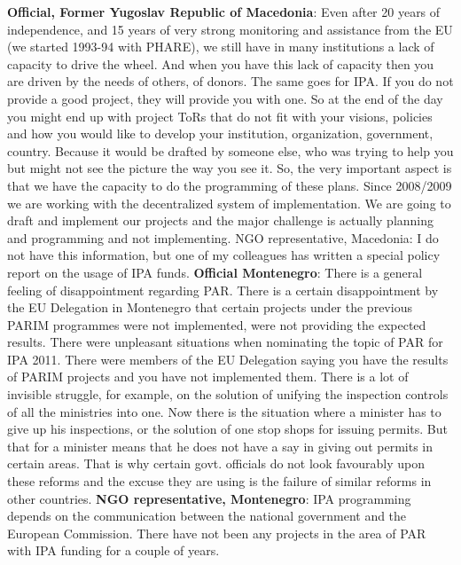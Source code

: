 \textbf{Official, Former Yugoslav Republic of Macedonia}: Even after 20 years of independence, and 15 years of very strong monitoring and assistance from the EU (we started 1993-94 with PHARE), we still have in many institutions a lack of capacity to drive the wheel. And when you have this lack of capacity then you are driven by the needs of others, of donors. The same goes for IPA. If you do not provide a good project, they will provide you with one. So at the end of the day you might end up with project ToRs that do not fit with your visions, policies and how you would like to develop your institution, organization, government, country. Because it would be drafted by someone else, who was trying to help you but might not see the picture the way you see it. So, the very important aspect is that we have the capacity to do the programming of these plans. Since 2008/2009 we are working with the decentralized system of implementation. We are going to draft and implement our projects and the major challenge is actually planning and programming and not implementing.
NGO representative, Macedonia: I do not have this information, but one of my colleagues has written a special policy report on the usage of IPA funds. 
\textbf{Official Montenegro}: There is a general feeling of disappointment regarding  PAR. There is a certain disappointment by the EU Delegation in Montenegro that certain projects under the previous PARIM programmes were not implemented, were not providing the expected results. There were unpleasant situations when nominating the topic of PAR for IPA 2011. There were members of the EU Delegation saying you have the results of PARIM projects and you have not implemented them. There is a lot of invisible struggle, for example, on the solution of unifying the inspection controls of all the ministries into one. Now there is the situation where a minister has to give up his inspections, or the solution of one stop shops for issuing permits. But that for a minister means that he does not have a say in giving out permits in certain areas. That is why certain govt. officials do not look favourably upon these reforms and the excuse they are using is the failure of similar reforms in other countries.
\textbf{NGO representative, Montenegro}: IPA programming depends on the communication between the national government and the European Commission. There have not been any projects in the area of PAR with IPA funding for a couple of years.\newpage
